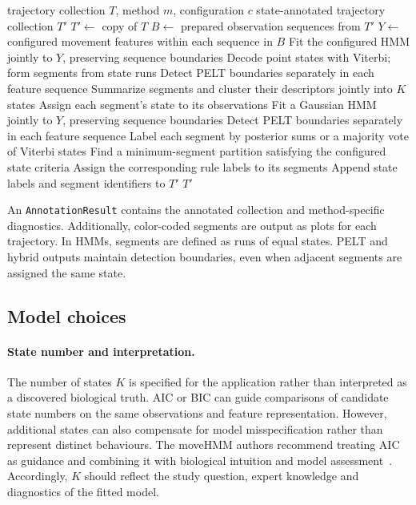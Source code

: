 \begin{algorithm}[htbp]
\caption{Trajectory segmentation and state annotation}
\label{alg:trajectory-segmentation}
\begin{algorithmic}[1]
\Require trajectory collection $T$, method $m$, configuration $c$
\Ensure state-annotated trajectory collection $T'$
\State $T'\gets$ copy of $T$
    \State $B\gets$ prepared observation sequences from $T'$ 
    \State $Y\gets$ configured movement features within each sequence in $B$
        \State Fit the configured HMM jointly to $Y$, preserving sequence boundaries
        \State Decode point states with Viterbi; form segments from state runs
        \State Detect PELT boundaries separately in each feature sequence
        \State Summarize segments and cluster their descriptors jointly into $K$ states
        \State Assign each segment's state to its observations
    \Else {}
        \State Fit a Gaussian HMM jointly to $Y$, preserving sequence boundaries
        \State Detect PELT boundaries separately in each feature sequence
        \State Label each segment by posterior sums or a majority vote of Viterbi states
    \EndIf
\Else {}
        \State Find a minimum-segment partition satisfying the configured state criteria
        \State Assign the corresponding rule labels to its segments
    \EndFor
\EndIf
\State Append state labels and segment identifiers to $T'$
\State \Return $T'$
\end{algorithmic}
\end{algorithm}

An \texttt{AnnotationResult} contains the annotated collection and method-specific diagnostics.
Additionally, color-coded segments are output as plots for each trajectory.
In HMMs, segments are defined as runs of equal states. 
PELT and hybrid outputs maintain detection boundaries, even when adjacent segments are assigned the same state.

\subsection{Model choices}
\label{subsec:seg-model-choices}
\paragraph{State number and interpretation.}
The number of states $K$ is specified for the application rather than interpreted as a discovered biological truth.
AIC or BIC can guide comparisons of candidate state numbers on the same observations and feature representation.
However, additional states can also compensate for model misspecification rather than represent distinct behaviours.
The moveHMM authors recommend treating AIC as guidance and combining it with biological intuition and model assessment~\cite{Michelot2016moveHMM}.
Accordingly, $K$ should reflect the study question, expert knowledge and diagnostics of the fitted model.

